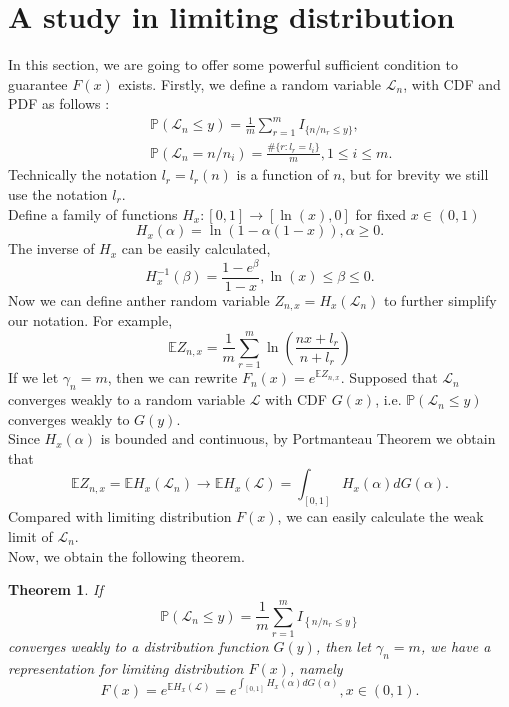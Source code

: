 \documentclass[12pt]{article}
\theoremstyle{plain}
\newtheorem{thm}{\textbf{Theorem}}
\theoremstyle{definition}
\theoremstyle{remark}
\begin{document}
\section{A study in limiting distribution}\label{sec: a study in gamma}
In this section, we are going to offer some powerful sufficient condition to guarantee $F(x)$ exists.
Firstly, we define a random variable $\mathscr{L}_n$, with CDF and PDF as follows :
\begin{eqnarray*}
    &&\mathbb{P}(\mathscr{L}_n \leq y )=\frac{1}{m}\sum_{r=1}^{m}I_{\{n/n_r\leq y\}},\\
    &&\mathbb{P}(\mathscr{L}_n = n/n_i )=\frac{\#\{r:l_r=l_i\}}{m},1\leq i\leq m.
\end{eqnarray*}
Technically the notation $l_r=l_r(n)$ is a function of $n$, but for brevity we still use the notation $l_r$.\\
Define a family of functions $H_x:[0,1]\rightarrow[\ln (x),0]$ for fixed $x\in (0,1)$
\begin{equation*}
    H_{x}(\alpha)=\ln(1-\alpha (1-x)),\alpha \geq 0.
\end{equation*}
The inverse of $H_{x}$ can be easily calculated,
\begin{equation*}
    H^{-1}_{x}(\beta)=\dfrac{1-e^ \beta}{1-x} ,\ln(x)\leq \beta\leq0.
\end{equation*}
Now we can define anther random variable $Z_{n,x}=H_{x}(\mathscr{L}_n)$ to further simplify our notation. For example,
\begin{equation*}
    \mathbb {E}Z_{n,x}=\frac{1}{m} \sum_{r=1}^{m} \ln \left(\frac{n x+l_{r}}{n+l_{r}}\right)
\end{equation*}
If we let $\gamma_{n}=m$, then we can rewrite $F_n(x)=e^{\mathbb{E}Z_{n,x}}$.
Supposed that $\mathscr{L}_n$ converges weakly to a random variable $\mathscr{L}$ with CDF $G(x)$, i.e. $\mathbb{P}(\mathscr{L}_n \leq y )$ converges weakly to $G(y)$.\\
Since $H_{x}(\alpha)$ is bounded and continuous, by Portmanteau Theorem we obtain that
\begin{equation*}
    \mathbb{E}Z_{n,x}=\mathbb{E}H_{x}(\mathscr{L}_n)\to \mathbb{E}H_{x}(\mathscr{L})=\int_{[0,1]}H_{x}(\alpha)dG(\alpha).
\end{equation*}
Compared with limiting distribution $F(x)$, we can easily calculate the weak limit of $\mathscr{L}_n$.\\
Now, we obtain the following theorem.
\begin{thm}\label{thm5}
    If
    \begin{equation*}
        \mathbb{P}\left(\mathscr{L}_{n} \leqslant y\right)=\frac{1}{m} \sum_{r=1}^{m} I_{\left\{n/n_{r}  \leqslant y\right\}}
    \end{equation*}
    converges weakly to a distribution function $G(y)$, then let $\gamma_{n}=m$, we have a representation for limiting distribution $F(x)$, namely
    \begin{equation}\label{Def_L_n}
    F(x)=e^{\mathbb{E}H_{x}(\mathscr{L})}=e^{\int_{[0,1]}H_x(\alpha)dG(\alpha)},x\in (0,1).
    \end{equation}
\end{thm}
\end{document}
